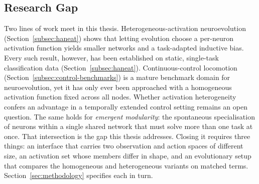 \documentclass[12pt]{article}
\newcommand{\revTerm}[2]{#2}
\begin{document}

\subsection{Research Gap}
\label{subsec:research-gap-and-contribution}


Two lines of work meet in this thesis.
Heterogeneous-activation neuroevolution (Section~\ref{subsec:haneat}) shows that letting evolution choose a per-neuron activation function yields smaller networks and a task-adapted inductive bias.
Every such result, however, has been established on static, single-task classification data (Section~\ref{subsec:haneat}).
Continuous-control locomotion (Section~\ref{subsec:control-benchmarks}) is a mature benchmark domain for neuroevolution, yet it has only ever been approached with a homogeneous activation function fixed across all nodes.
Whether activation heterogeneity confers an advantage in a temporally extended control setting remains an open question.
The same holds for \emph{emergent modularity}: the spontaneous specialisation of neurons within a single shared network that must solve more than one task at once.
That intersection is the gap this thesis addresses.
Closing it requires three things: an interface that carries two observation and action spaces of different size, \revTerm{T-05}{an activation set whose members differ in shape}, and an evolutionary setup that compares the homogeneous and heterogeneous variants on matched terms.
Section~\ref{sec:methodology} specifies each in turn.
\end{document}
